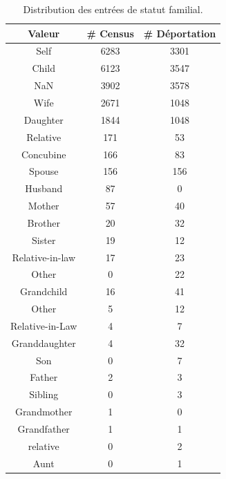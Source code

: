 \documentclass[a4paper,12pt,twoside]{book}
\begin{document}
                \begin{table}[ht]
                    \centering
                    \renewcommand\cellalign{cl}
                        \begin{tabular}{|c|c|c|}
                            \hline
                            Valeur & \# Census & \# Déportation\\\hline
                            Self & 6283 & 3301 \\\hline
                            Child & 6123 & 3547 \\\hline
                            NaN & 3902 & 3578 \\\hline
                            Wife & 2671 & 1048 \\\hline
                            Daughter & 1844 & 1048 \\\hline
                            Relative & 171 & 53 \\\hline
                            Concubine & 166 & 83 \\\hline
                            Spouse &  156 & 156 \\\hline
                            Husband & 87 & 0 \\\hline
                            Mother & 57 & 40 \\\hline
                            Brother & 20 & 32 \\\hline
                            Sister & 19 & 12 \\\hline
                            Relative-in-law & 17 & 23 \\\hline
                            Other & 0 & 22 \\\hline
                            Grandchild & 16 & 41 \\\hline
                            Other & 5 & 12 \\\hline
                            Relative-in-Law & 4 & 7 \\\hline 
                            Granddaughter & 4 & 32 \\\hline
                            Son & 0 & 7 \\\hline
                            Father &    2 & 3 \\\hline
                            Sibling &    0 & 3 \\\hline
                            Grandmother & 1 & 0 \\\hline
                            Grandfather & 1 & 1 \\\hline
                            relative & 0 & 2 \\\hline
                            Aunt & 0 & 1 \\\hline  
                        \end{tabular}
                \caption{Distribution des entrées de statut familial.}\label{tab6}
                \end{table}
                
\end{document}
